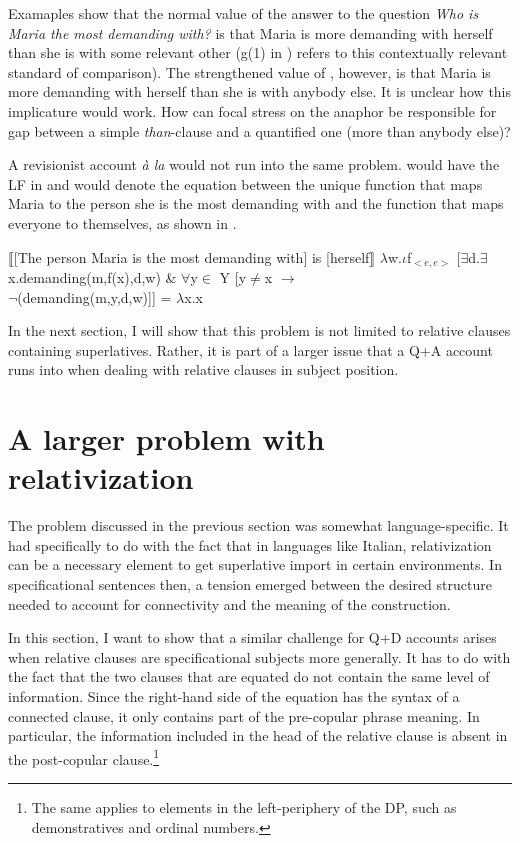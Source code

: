 \documentclass[output=paper,colorlinks,citecolor=brown,draft,draftmode]{langscibook}
\begin{document}
Examaples  show that the normal value of the answer to the question \textit{Who is Maria the most demanding with?} is that Maria is more demanding with herself than she is with some relevant other (g(1) in ) refers to this contextually relevant standard of comparison). The strengthened value of , however, is that Maria is more demanding with herself than she is with anybody else.
It is unclear how this implicature would  work. How can focal stress on the anaphor be responsible for gap between a simple \textit{than}-clause and a quantified one (more than anybody else)?


A revisionist account \textit{à la} \citet{sharvit1999connectivity} would not run into the same problem.
  would have the LF in  and would denote the equation between the unique function that maps Maria to the person she is the most demanding with and the function that maps everyone to themselves, as shown in .

 \ea \ea \label{revis1}
 $\llbracket${[The person Maria is the most demanding with] is [herself}$\rrbracket$
\ex \label{revis2}$\lambda$w.$\iota$f$_{<e,e>}$ [$\exists$d.$\exists$x.demanding(m,f(x),d,w) \& $\forall$y$\in$ Y [y$\neq$x $\rightarrow$ \\ $\neg$(demanding(m,y,d,w)]] = $\lambda$x.x
\z
\z

In the next section, I will show that this problem is not limited to relative clauses containing superlatives. Rather, it is part of a larger issue that a Q+A account runs into when dealing with relative clauses in subject position.


\section{A larger problem with relativization}
\label{secrelativization}

The problem discussed in the previous section was somewhat language-specific. It had specifically to do with the fact that in languages like Italian, relativization can be a necessary element to get superlative import in certain environments. In specificational sentences then, a tension emerged between the desired structure needed to account for connectivity and the meaning of the construction.

In this section, I want to show that a similar challenge for Q+D accounts arises when relative clauses are specificational subjects more generally. It has to do with the fact that the two clauses that are equated do not contain the same level of information. Since the right-hand side of the equation has the syntax of a connected clause, it only contains part of the pre-copular phrase meaning. In particular, the information included in the head of the relative clause is absent in the post-copular clause.\footnote{The same applies to elements in the left-periphery of the DP, such as demonstratives and ordinal numbers.}
\end{document}
